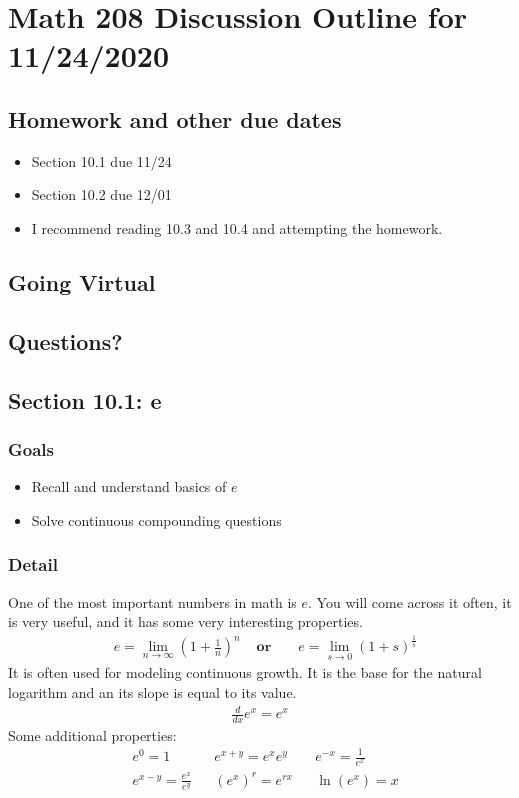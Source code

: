 \documentclass[14pt]{extarticle}
\begin{document}
\section*{Math 208 Discussion Outline for 11/24/2020}


\subsection{Homework and other due dates}
\begin{itemize}

\item Section 10.1 due 11/24
\item Section 10.2 due 12/01
\item I recommend reading 10.3 and 10.4 and attempting the homework.
\end{itemize}

\subsection{Going Virtual}

\subsection{Questions?}

\subsection{Section 10.1: e}
\subsubsection*{Goals}
\begin{itemize}
	\item Recall and understand basics of $e$
	\item Solve continuous compounding questions
\end{itemize}
\subsubsection*{Detail}
One  of the most important numbers in math is $e$. You will come across it often, it is very useful, and it has some very interesting properties.
\begin{align*}
	&e = \lim_{n \to \infty} \left(1 + \frac{1}{n}\right)^n &
	\textbf{ or } &
	&e = \lim_{s \to 0} \left(1 + s\right)^{\frac{1}{s}}
\end{align*}
It is often used for modeling continuous growth. It is the base for the natural logarithm and an its slope is equal to its value.
\begin{align*}
	\frac{d}{dx}e^x =  e^x
\end{align*}
Some additional properties:
\begin{align*}
	&e^0 = 1 & &e^{x+y} = e^x e^y & &e^{-x}=\frac{1}{e^x} \\
	&e^{x-y} = \frac{e^x}{e^y }	& &(e^x)^r= e^{rx} & &\ln(e^x) = x
\end{align*}
\end{document}
